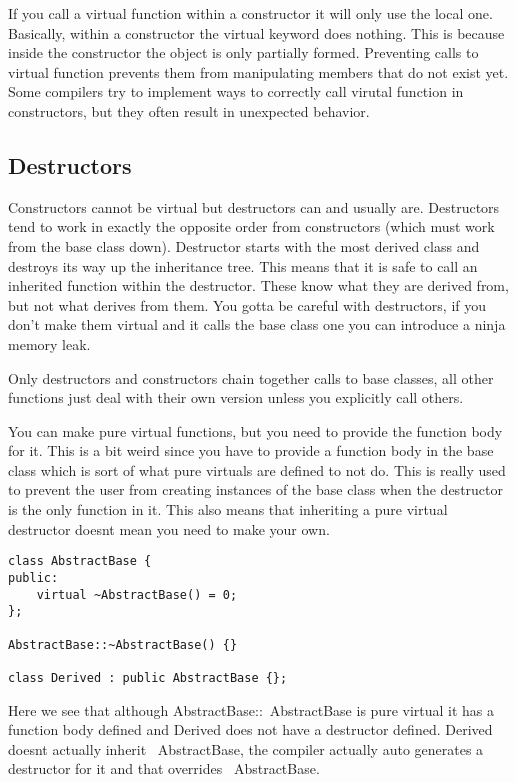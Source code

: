 \documentclass[12pt]{article}
\begin{document}
If you call a virtual function within a constructor it will only use the local one. Basically, within a constructor the virtual keyword does nothing. This is because inside the constructor the object is only partially formed. Preventing calls to virtual function prevents them from manipulating members that do not exist yet. Some compilers try to implement ways to correctly call virutal function in constructors, but they often result in unexpected behavior.

\subsection*{Destructors}
Constructors cannot be virtual but destructors can and usually are. Destructors tend to work in exactly the opposite order from constructors (which must work from the base class down). Destructor starts with the most derived class and destroys its way up the inheritance tree. This means that it is safe to call an inherited function within the destructor. These know what they are derived from, but not what derives from them. You gotta be careful with destructors, if you don't make them virtual and it calls the base class one you can introduce a ninja memory leak.

Only destructors and constructors chain together calls to base classes, all other functions just deal with their own version unless you explicitly call others.

You can make pure virtual functions, but you need to provide the function body for it. This is a bit weird since you have to provide a function body in the base class which is sort of what pure virtuals are defined to not do. This is really used to prevent the user from creating instances of the base class when the destructor is the only function in it. This also means that inheriting a pure virtual destructor doesnt mean you need to make your own.

\begin{lstlisting}
class AbstractBase {
public:
    virtual ~AbstractBase() = 0;
};

AbstractBase::~AbstractBase() {}

class Derived : public AbstractBase {};
\end{lstlisting}

Here we see that although AbstractBase::~AbstractBase is pure virtual it has a function body defined and Derived does not have a destructor defined. Derived doesnt actually inherit ~AbstractBase, the compiler actually auto generates a destructor for it and that overrides ~AbstractBase.
\end{document}
